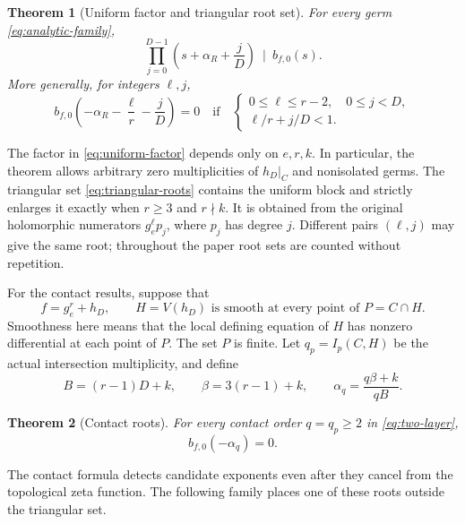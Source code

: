 \documentclass[11pt]{article}
\numberwithin{equation}{section}
\newtheorem{theorem}{Theorem}[section]
\theoremstyle{definition}
\theoremstyle{remark}
\newcommand{\bfzero}{b_{f,0}}
\begin{document}
\begin{theorem}[Uniform factor and triangular root set]
\label{thm:uniform}
For every germ \eqref{eq:analytic-family},
\begin{equation}\label{eq:uniform-factor}
 \prod_{j=0}^{D-1}\left(s+\alpha_R+\frac jD\right)
 \ \mid\ \bfzero(s).
\end{equation}
More generally, for integers $\ell,j$,
\begin{equation}\label{eq:triangular-roots}
 \bfzero\!\left(-\alpha_R-\frac\ell r-\frac jD\right)=0
 \quad\text{if}\quad
 \begin{cases}
  0\le\ell\le r-2,\quad 0\le j<D,\\
  \ell/r+j/D<1.
 \end{cases}
\end{equation}
\end{theorem}

The factor in \eqref{eq:uniform-factor} depends only on $e,r,k$.
In particular, the theorem allows arbitrary zero multiplicities
of $h_D|_C$ and nonisolated germs. The triangular set
\eqref{eq:triangular-roots} contains the uniform block and
strictly enlarges it exactly when $r\ge3$ and $r\nmid k$.
It is obtained from the original
holomorphic numerators $g_e^\ell p_j$, where $p_j$ has degree $j$.
Different pairs $(\ell,j)$ may give the same root; throughout the
paper root sets are counted without repetition.

For the contact results, suppose that
\begin{equation}\label{eq:two-layer}
 f=g_e^r+h_D,\qquad H=V(h_D)\text{ is smooth at every point of }
 P=C\cap H.
\end{equation}
Smoothness here means that the local defining equation of
$H$ has nonzero differential at each point of $P$.
The set $P$ is finite. Let $q_p=I_p(C,H)$ be the actual
intersection multiplicity, and define
\begin{equation}\label{eq:contact-data}
 B=(r-1)D+k,\qquad \beta=3(r-1)+k,\qquad
 \alpha_q=\frac{q\beta+k}{qB}.
\end{equation}

\begin{theorem}[Contact roots]\label{thm:contact}
For every contact order $q=q_p\ge2$ in \eqref{eq:two-layer},
\begin{equation}\label{eq:contact-root}
 \bfzero(-\alpha_q)=0.
\end{equation}
\end{theorem}

The contact formula detects candidate exponents even after
they cancel from the topological zeta function. The following
family places one of these roots outside the triangular set.
\end{document}
